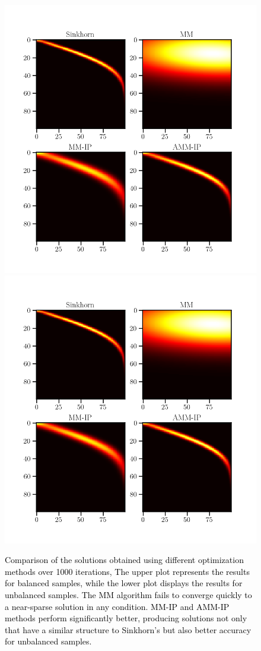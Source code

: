 \documentclass[a4paper,twocolumn]{article}
\newcommand{\changeSX}[1]{\textcolor{black}{#1}}
\begin{document}
\begin{figure}[tp]
\centering
\includegraphics[width = 0.99\linewidth]{pic/ex2}
\centering
\includegraphics[width = 0.99\linewidth]{pic/ex4}
\setlength{\belowcaptionskip}{-30pt}
\caption{\changeSX{Comparison of the solutions obtained using different optimization methods over 1000 iterations, The upper plot represents the results for balanced samples, while the lower plot displays the results for unbalanced samples. The MM algorithm fails to converge quickly to a near-sparse solution in any condition. MM-IP and AMM-IP methods perform significantly better, producing solutions not only that have a similar structure to Sinkhorn's but also better accuracy for unbalanced samples.}}
\label{Fig:ex2}
\end{figure}
\end{document}
